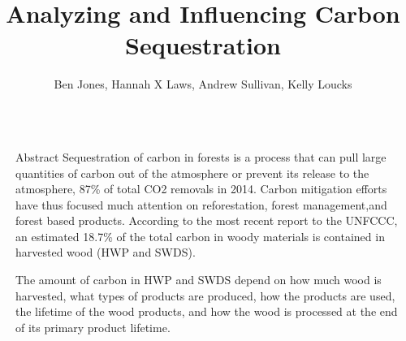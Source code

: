 \documentclass[final]{beamer}\usepackage[]{graphicx}\usepackage[]{color}
\title{Analyzing and Influencing Carbon Sequestration}
\author{Ben Jones, Hannah X Laws, Andrew Sullivan, Kelly Loucks}
\institute{Department of Mathematical Sciences}
\newlength{\sepwid}
\newlength{\onecolwid}
\begin{document}

\setlength{\belowcaptionskip}{2ex} %
\setlength\belowdisplayshortskip{2ex} %

\begin{frame}[t] %


\begin{columns}[t] %

\begin{column}{\sepwid}\end{column} %

\begin{column}{\onecolwid} %


\begin{alertblock}{Abstract}
Sequestration of carbon in forests is a process that can pull large quantities of carbon out of the atmosphere or prevent its release to the atmosphere, 87\% of total CO2 removals in 2014. Carbon mitigation efforts have thus focused much attention on reforestation, forest management,and forest based products. According to the most recent report to the UNFCCC, an estimated 18.7\% of the total carbon in woody materials is contained in harvested wood (HWP and SWDS).  


The amount of carbon in HWP and SWDS depend on how much wood is harvested, what types of products are produced, how the products are used, the lifetime of the wood products, and how the wood is processed at the end of its primary product lifetime.

\end{alertblock}



\end{column}
\end{columns}
\end{frame}
\end{document}
